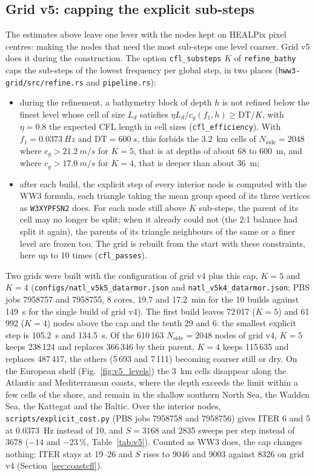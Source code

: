 \documentclass[11pt,a4paper]{article}
\newcommand{\nside}{N_{\mathrm{side}}}
\begin{document}
\subsection{Grid v5: capping the explicit sub-steps}\label{sec:v5}
The estimates above leave one lever with the nodes kept on HEALPix pixel
centres: making the nodes that need the most sub-steps one level coarser.
Grid v5 does it during the construction. The option
\texttt{cfl\_substeps} $K$ of \texttt{refine\_bathy} caps the sub-steps of
the lowest frequency per global step, in two places
(\texttt{hww3-grid/src/refine.rs} and \texttt{pipeline.rs}):
\begin{itemize}
\item during the refinement, a bathymetry block of depth $h$ is not
  refined below the finest level whose cell of size $L_d$ satisfies
  $\eta L_d/c_g(f_1,h)\ge\mathrm{DT}/K$, with $\eta=0.8$ the expected CFL
  length in cell sizes (\texttt{cfl\_efficiency}). With
  $f_1=\SI{0.0373}{Hz}$ and $\mathrm{DT}=\SI{600}{s}$, this forbids the
  \SI{3.2}{km} cells of $\nside=2048$ where $c_g>\SI{21.2}{m/s}$ for $K=5$,
  that is at depths of about 68 to \SI{600}{m}, and where
  $c_g>\SI{17.0}{m/s}$ for $K=4$, that is deeper than about \SI{36}{m};
\item after each build, the explicit step of every interior node is
  computed with the WW3 formula, each triangle taking the mean group speed
  of its three vertices as \texttt{W3XYPFSN2} does. For each node still
  above $K$ sub-steps, the parent of its cell may no longer be split; when
  it already could not (the 2:1 balance had split it again), the parents
  of its triangle neighbours of the same or a finer level are frozen too.
  The grid is rebuilt from the start with these constraints, here up to 10
  times (\texttt{cfl\_passes}).
\end{itemize}
Two grids were built with the configuration of grid v4 plus this cap,
$K=5$ and $K=4$ (\texttt{configs/natl\_v5k5\_datarmor.json} and
\texttt{natl\_v5k4\_datarmor.json}; PBS jobs 7958757 and 7958755, 8 cores,
19.7 and \SI{17.2}{min} for the 10 builds against \SI{149}{s} for the
single build of grid v4). The first build leaves 72\,017 ($K=5$) and
61\,992 ($K=4$) nodes above the cap and the tenth 29 and 6: the smallest
explicit step is \SI{105.2}{s} and \SI{134.5}{s}. Of the 610\,163
$\nside=2048$ nodes of grid v4, $K=5$ keeps 238\,124 and replaces
366\,346 by their parent, $K=4$ keeps 115\,635 and replaces 487\,417, the
others (5\,693 and 7\,111) becoming coarser still or dry. On the European
shelf (Fig.~\ref{fig:v5_levels}) the \SI{3}{km} cells disappear along the
Atlantic and Mediterranean coasts, where the depth exceeds the limit
within a few cells of the shore, and remain in the shallow southern North
Sea, the Wadden Sea, the Kattegat and the Baltic.
Over the interior nodes, \texttt{scripts/explicit\_cost.py} (PBS jobs
7958758 and 7958756) gives ITER 6 and 5 at \SI{0.0373}{Hz} instead of 10,
and $S=3168$ and 2835 sweeps per step instead of 3678 ($-14$ and
$-23\,\%$, Table~\ref{tab:v5}). Counted as WW3 does, the cap changes
nothing: ITER stays at 19--26 and $S$ rises to 9046 and 9003 against 8326
on grid v4 (Section~\ref{sec:coastcfl}).
\end{document}
